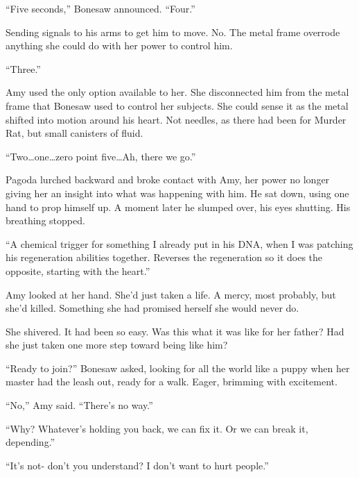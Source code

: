 ``Five seconds,'' Bonesaw announced.  ``Four.''



Sending signals to his arms to get him to move.  No.  The metal frame overrode anything she could do with her power to control him.



``Three.''



Amy used the only option available to her.  She disconnected him from the metal frame that Bonesaw used to control her subjects.  She could sense it as the metal shifted into motion around his heart.  Not needles, as there had been for Murder Rat, but small canisters of fluid.



``Two\ldots one\ldots zero point five\ldots Ah, there we go.''



Pagoda lurched backward and broke contact with Amy, her power no longer giving her an insight into what was happening with him.  He sat down, using one hand to prop himself up.  A moment later he slumped over, his eyes shutting.  His breathing stopped.



``A chemical trigger for something I already put in his DNA, when I was patching his regeneration abilities together.  Reverses the regeneration so it does the opposite, starting with the heart.''



Amy looked at her hand.  She'd just taken a life.  A mercy, most probably, but she'd killed.  Something she had promised herself she would never do.



She shivered.  It had been so easy.  Was this what it was like for her father?  Had she just taken one more step toward being like him?



``Ready to join?'' Bonesaw asked, looking for all the world like a puppy when her master had the leash out, ready for a walk.  Eager, brimming with excitement.



``No,'' Amy said.  ``There's no way.''



``Why?  Whatever's holding you back, we can fix it.  Or we can break it, depending.''



``It's not- don't you understand?  I don't want to hurt people.''



